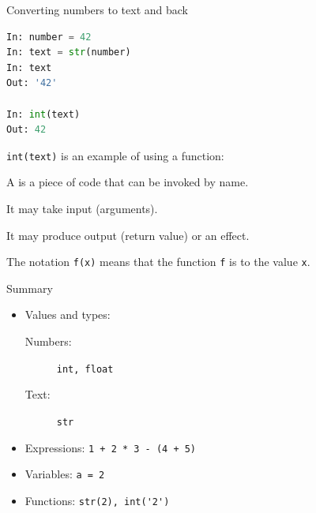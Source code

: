 \documentclass[aspectratio=169,usenames,dvipsnames]{beamer}
\begin{document}
\begin{frame}[fragile]{Converting numbers to text and back}
\begin{lstlisting}[language=python]
In: number = 42
In: text = str(number)
In: text
Out: '42'

In: int(text)
Out: 42
\end{lstlisting}

    \lstinline{int(text)} is an example of using a function:

    \begin{definition}
        A  is a piece of code
        that can be invoked by name.

        It may take input (arguments).
        
        It may produce output (return value) or an effect.

        The notation \lstinline{f(x)} means that the function \lstinline{f}
        is  to the value \lstinline{x}.
    \end{definition}

\end{frame}


\begin{frame}{Summary}
    \begin{itemize}
        \item Values and types:
            \begin{description}
                \item[Numbers:] \lstinline{int, float}
                \item[Text:] \lstinline{str}
            \end{description}
        \item Expressions: \lstinline{1 + 2 * 3 - (4 + 5)}
        \item Variables: \lstinline{a = 2}
        \item Functions: \lstinline{str(2), int('2')}
    \end{itemize}
\end{frame}
\end{document}
